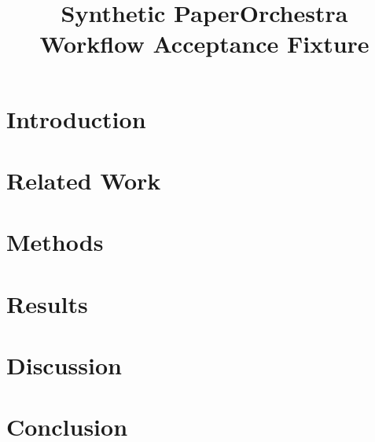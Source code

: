 \documentclass[10pt]{article}
\title{Synthetic PaperOrchestra Workflow Acceptance Fixture}
\author{}
\date{}
\begin{document}
\maketitle
\begin{abstract}
\end{abstract}
\section{Introduction}
\section{Related Work}
\section{Methods}
\section{Results}
\section{Discussion}
\section{Conclusion}


\end{document}

